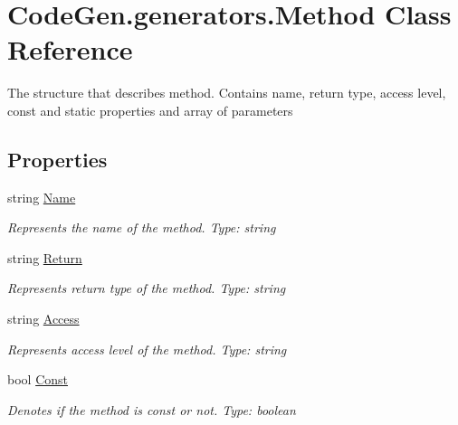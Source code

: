 \hypertarget{classCodeGen_1_1generators_1_1Method}{}\section{Code\+Gen.\+generators.\+Method Class Reference}
\label{classCodeGen_1_1generators_1_1Method}


The structure that describes method. Contains name, return type, access level, const and static properties and array of parameters  


\subsection*{Properties}
\begin{DoxyCompactItemize}
\item 
string \mbox{\hyperlink{classCodeGen_1_1generators_1_1Method_a102f86b59635b173d66ed34541cf3e4c}{Name}}
\begin{DoxyCompactList}\small\item\em Represents the name of the method. Type\+: string \end{DoxyCompactList}\item 
string \mbox{\hyperlink{classCodeGen_1_1generators_1_1Method_a1f14ec7aef5e61d595870f2fee56a885}{Return}}
\begin{DoxyCompactList}\small\item\em Represents return type of the method. Type\+: string \end{DoxyCompactList}\item 
string \mbox{\hyperlink{classCodeGen_1_1generators_1_1Method_ad713380461315774e85e7316f9a48df9}{Access}}
\begin{DoxyCompactList}\small\item\em Represents access level of the method. Type\+: string \end{DoxyCompactList}\item 
bool \mbox{\hyperlink{classCodeGen_1_1generators_1_1Method_a31ce28145fc93a8b16dc8a1132a73694}{Const}}
\begin{DoxyCompactList}\small\item\em Denotes if the method is const or not. Type\+: boolean \end{DoxyCompactList}\item 

\end{DoxyCompactItemize}
